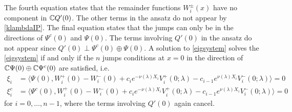 \documentclass[10pt,reqno]{amsart}
\theoremstyle{plain}
\theoremstyle{definition}
\theoremstyle{remark}
\numberwithin{theorem}{section}
\numberwithin{equation}{section}
\begin{document}
The fourth equation states that the remainder functions $W_i^\pm(x)$ have no component in $\mathbb{C} Q'(0)$. The other terms in the ansatz do not appear by \cref{klambdaIP}. The final equation states that the jumps can only be in the directions of $\Psi^c(0)$ and $\Psi(0)$. The terms involving $Q'(0)$ in the ansatz do not appear since $Q'(0) \perp \Psi^c(0)\oplus\Psi(0)$. A solution to \eqref{eigsystem} solves the \cref{eigsystem} if and only if the $n$ jumps conditions at $x = 0$ in the direction of $\mathbb{C} \Psi(0) \oplus \mathbb{C} \Psi^c(0)$ are satisfied, i.e.  
\begin{equation}\label{jumpxi1}
\begin{aligned}
\xi_i &= \langle \Psi(0), W_i^+(0) - W_i^-(0) + c_i e^{-\nu(\lambda)X_i}V_i^+(0; \lambda) - c_{i-1} e^{\nu(\lambda)X_i} V_i^-(0; \lambda) \rangle = 0  \\
\xi_i^c &= \langle \Psi^c(0), W_i^+(0) - W_i^-(0) + c_i e^{-\nu(\lambda)X_i}V_i^+(0; \lambda) - c_{i-1} e^{\nu(\lambda)X_i} V_i^-(0; \lambda) \rangle = 0 
\end{aligned}
\end{equation}
for $i = 0, \dots, n-1$, where the terms involving $Q'(0)$ again cancel.
\end{document}
